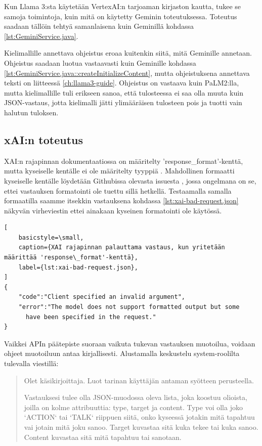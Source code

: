 Kun Llama 3:sta käytetään VertexAI:n tarjoaman kirjaston kautta, tukee se
samoja toimintoja, kuin mitä on käytetty Geminin toteutuksessa. Toteutus
saadaan tällöin tehtyä samanlaisena kuin Geminillä kohdassa
\ref{lst:GeminiService.java}.

Kielimallille annettava ohjeistus eroaa kuitenkin siitä, mitä Geminille
annetaan. Ohjeistus saadaan luotua vastaavasti kuin Geminille kohdassa
\ref{lst:GeminiService.java::createInitializeContent}, mutta ohjeistuksena
annettava teksti on liitteessä \ref{ch:llama3-guide}. Ohjeistus on vastaava
kuin PaLM2:lla, mutta kielimallille tuli erikseen sanoa, että tulosteessa ei
saa olla muuta kuin JSON-vastaus, jotta kielimalli jätti ylimääräisen
tulosteen pois ja tuotti vain halutun tuloksen.

\subsection{xAI:n toteutus}

XAI:n rajapinnan dokumentaatiossa on määritelty 'response\_format'-kenttä, mutta
kyseiselle kentälle ei ole määritelty tyyppiä \parencite{xAIDocsEndpoints}.
Mahdollinen formaatti kyseiselle kentälle löydetään Githubissa olevasta
issuesta \parencite{githubBerriAIlitellmIssues6610}, jossa ongelmana on se,
ettei vastauksen formatointi ole tuettu sillä hetkellä. Testaamalla samalla
formaatilla saamme itsekkin vastauksena kohdassa \ref{lst:xai-bad-request.json}
näkyvän virheviestin ettei ainakaan kyseinen formatointi ole käytössä.

\begin{lstlisting}[
    basicstyle=\small,
    caption={XAI rajapinnan palauttama vastaus, kun yritetään määrittää 'response\_format'-kenttä},
    label={lst:xai-bad-request.json},
]
{
    "code":"Client specified an invalid argument",
    "error":"The model does not support formatted output but some
      have been specified in the request."
}
\end{lstlisting}

Vaikkei APIn päätepiste suoraan vaikuta tukevan vastauksen muotoilua, voidaan
ohjeet muotoiluun antaa kirjallisesti. Alustamalla keskustelu system-roolilta
tulevalla viestillä:

\begin{quotation}
    \noindent Olet käsikirjoittaja. Luot tarinan käyttäjän antaman syötteen
    perusteella.

    \noindent Vastauksesi tulee olla JSON-muodossa oleva lista, joka koostuu
    olioista, joilla on kolme attribuuttia: type, target ja content. Type voi
    olla joko `ACTION` tai `TALK` riippuen siitä, onko kyseessä jotakin mitä
    tapahtuu vai jotain mitä joku sanoo. Target kuvastaa sitä kuka tekee tai
    kuka sanoo. Content kuvastaa sitä mitä tapahtuu tai sanotaan.
\end{quotation}

